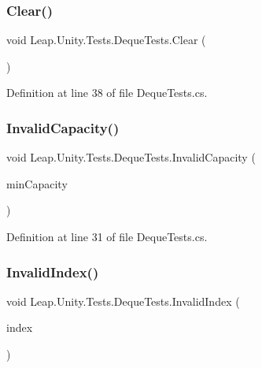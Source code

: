 \subsubsection{\texorpdfstring{Clear()}{Clear()}}
{\footnotesize\ttfamily void Leap.\+Unity.\+Tests.\+Deque\+Tests.\+Clear (\begin{DoxyParamCaption}{ }\end{DoxyParamCaption})}



Definition at line 38 of file Deque\+Tests.\+cs.

\mbox{\label{class_leap_1_1_unity_1_1_tests_1_1_deque_tests_af64bfa74314ea49820b42c74a3fdfe75}} 
\subsubsection{\texorpdfstring{InvalidCapacity()}{InvalidCapacity()}}
{\footnotesize\ttfamily void Leap.\+Unity.\+Tests.\+Deque\+Tests.\+Invalid\+Capacity (\begin{DoxyParamCaption}\item[{\mbox{[}\+Values(int.\+Min\+Value, -\/1, 0)\mbox{]} int}]{min\+Capacity }\end{DoxyParamCaption})}



Definition at line 31 of file Deque\+Tests.\+cs.

\mbox{\label{class_leap_1_1_unity_1_1_tests_1_1_deque_tests_ade72d19588768201ee7f1d4a73946884}} 
\subsubsection{\texorpdfstring{InvalidIndex()}{InvalidIndex()}}
{\footnotesize\ttfamily void Leap.\+Unity.\+Tests.\+Deque\+Tests.\+Invalid\+Index (\begin{DoxyParamCaption}\item[{\mbox{[}\+Values(int.\+Min\+Value, -\/1, 5, int.\+Max\+Value)\mbox{]} int}]{index }\end{DoxyParamCaption})}



